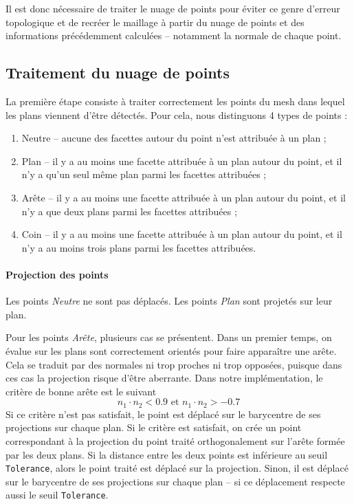 ﻿\documentclass[12pt, twoside]{article}
\begin{document}
Il est donc nécessaire de traiter le nuage de points pour éviter ce genre d'erreur topologique et de recréer le maillage à partir du nuage de points et des informations précédemment calculées -- notamment la normale de chaque point.

\subsection{Traitement du nuage de points}
La première étape consiste à traiter correctement les points du mesh dans lequel les plans viennent d'être détectés. Pour cela, nous distinguons 4 types de points :
\begin{enumerate}
  \item Neutre -- aucune des facettes autour du point n'est attribuée à un plan ;
  \item Plan -- il y a au moins une facette attribuée à un plan autour du point, et il n'y a qu'un seul même plan parmi les facettes attribuées ;
  \item Arête -- il y a au moins une facette attribuée à un plan autour du point, et il n'y a que deux plans parmi les facettes attribuées ;
  \item Coin -- il y a au moins une facette attribuée à un plan autour du point, et il n'y a au moins trois plans parmi les facettes attribuées.
\end{enumerate}

\paragraph{Projection des points} Les points \textit{Neutre} ne sont pas déplacés. Les points \textit{Plan} sont projetés sur leur plan.

Pour les points \textit{Arête}, plusieurs cas se présentent. Dans un premier temps, on évalue sur les plans sont correctement orientés pour faire apparaître une arête. Cela se traduit par des normales ni trop proches ni trop opposées, puisque dans ces cas la projection risque d'être aberrante. Dans notre implémentation, le critère de bonne arête est le suivant
$$n_1\cdot n_2 < 0.9 \text{ et } n_1\cdot n_2 > -0.7$$
Si ce critère n'est pas satisfait, le point est déplacé sur le barycentre de ses projections sur chaque plan. Si le critère est satisfait, on crée un point correspondant à la projection du point traité orthogonalement sur l'arête formée par les deux plans. Si la distance entre les deux points est inférieure au seuil \texttt{Tolerance}, alors le point traité est déplacé sur la projection. Sinon, il est déplacé sur le barycentre de ses projections sur chaque plan -- si ce déplacement respecte aussi le seuil \texttt{Tolerance}.
\end{document}
